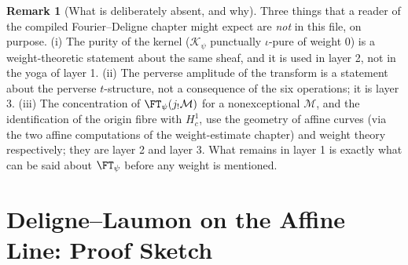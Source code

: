 \documentclass[11pt]{article}
\makeatletter
\theoremstyle{plain}
\theoremstyle{definition}
\newtheorem{remark}[theorem]{Remark}
\newcommand{\up}[1]{%
  \ifcsname r@#1\endcsname
    \hyperref[#1]{\texttt{\scriptsize #1}}%
  \else
    \texttt{\scriptsize #1}%
  \fi}
\newcommand{\uses}[1]{\par\smallskip\noindent{\footnotesize\textit{Uses:}\ #1\par}\smallskip}
\makeatother
\begin{document}
\begin{remark}[What is deliberately absent, and why]
\label{rem:absent}
Three things that a reader of the compiled Fourier--Deligne chapter might expect are
\emph{not} in this file, on purpose.  (i) The purity of the kernel
($\mathcal K_\psi$ punctually $\iota$-pure of weight $0$) is a weight-theoretic
statement about the same sheaf, and it is used in layer 2, not in the yoga of
layer 1.  (ii) The perverse amplitude of the transform is a statement about
the perverse $t$-structure, not a consequence of the six operations; it is
layer 3.  (iii) The concentration of $\FT_\psi(j_!\mathcal M)$ for a
nonexceptional $\mathcal M$, and the identification of the origin fibre with
$H^1_c$, use the geometry of affine curves (via the two affine computations of
the weight-estimate chapter) and weight theory respectively; they are layer 2
and layer 3.  What remains in layer 1 is exactly what can be said about
$\FT_\psi$ before any weight is mentioned.
\end{remark}
\endgroup
\clearpage
\begingroup
\setlength{\emergencystretch}{3em}
\newcommand{\DLAQ}{\overline{\mathbf Q}_\ell}
\newcommand{\DLAFT}{\operatorname{FT}}
\newcommand{\DLAFr}{\operatorname{Fr}}
\renewcommand{\up}[1]{%
  \ifcsname r@#1\endcsname
    \hyperref[#1]{\textnormal{\scriptsize\nolinkurl{#1}}}%
  \else
    \textnormal{\scriptsize\nolinkurl{#1}}%
  \fi}
\let\dlauses\uses
\renewcommand{\uses}[1]{{\raggedright\dlauses{#1}}}
\ExplSyntaxOn
{}
\ExplSyntaxOff

\section{Deligne--Laumon on the Affine Line: Proof Sketch}
\label{sec:deligne-laumon-a1}
\begin{abstract}
content: a sketch of the affine-line weight estimate via curve perverse sheaves,
Fourier transform, real-sheaf purity, and positive squared traces.
\\key result: Theorem~\ref{thm:dl-a1-upper}.
\\references: KW
\end{abstract}
\end{document}
